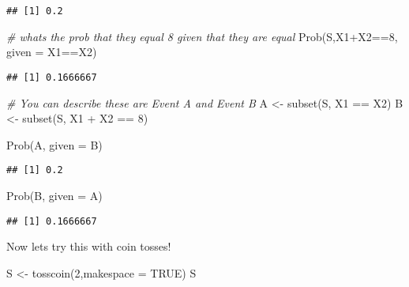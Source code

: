 \documentclass[
]{article}
\newenvironment{Shaded}{\begin{snugshade}}{\end{snugshade}}
\newcommand{\AttributeTok}[1]{\textcolor[rgb]{0.77,0.63,0.00}{#1}}
\newcommand{\CommentTok}[1]{\textcolor[rgb]{0.56,0.35,0.01}{\textit{#1}}}
\newcommand{\ConstantTok}[1]{\textcolor[rgb]{0.00,0.00,0.00}{#1}}
\newcommand{\DecValTok}[1]{\textcolor[rgb]{0.00,0.00,0.81}{#1}}
\newcommand{\FunctionTok}[1]{\textcolor[rgb]{0.00,0.00,0.00}{#1}}
\newcommand{\NormalTok}[1]{#1}
\newcommand{\OtherTok}[1]{\textcolor[rgb]{0.56,0.35,0.01}{#1}}
\newcommand{\SpecialCharTok}[1]{\textcolor[rgb]{0.00,0.00,0.00}{#1}}
\begin{document}
\begin{verbatim}
## [1] 0.2
\end{verbatim}

\begin{Shaded}
\begin{Highlighting}[]
\CommentTok{\# whats the prob that they equal 8 given that they are equal}
\FunctionTok{Prob}\NormalTok{(S,X1}\SpecialCharTok{+}\NormalTok{X2}\SpecialCharTok{==}\DecValTok{8}\NormalTok{, }\AttributeTok{given =}\NormalTok{ X1}\SpecialCharTok{==}\NormalTok{X2)}
\end{Highlighting}
\end{Shaded}

\begin{verbatim}
## [1] 0.1666667
\end{verbatim}

\begin{Shaded}
\begin{Highlighting}[]
\CommentTok{\# You can describe these are Event A and Event B}
\NormalTok{A }\OtherTok{\textless{}{-}} \FunctionTok{subset}\NormalTok{(S, X1 }\SpecialCharTok{==}\NormalTok{ X2)}
\NormalTok{B }\OtherTok{\textless{}{-}} \FunctionTok{subset}\NormalTok{(S, X1 }\SpecialCharTok{+}\NormalTok{ X2 }\SpecialCharTok{==} \DecValTok{8}\NormalTok{)}

\FunctionTok{Prob}\NormalTok{(A, }\AttributeTok{given =}\NormalTok{ B)}
\end{Highlighting}
\end{Shaded}

\begin{verbatim}
## [1] 0.2
\end{verbatim}

\begin{Shaded}
\begin{Highlighting}[]
\FunctionTok{Prob}\NormalTok{(B, }\AttributeTok{given =}\NormalTok{ A)}
\end{Highlighting}
\end{Shaded}

\begin{verbatim}
## [1] 0.1666667
\end{verbatim}

Now lets try this with coin tosses!

\begin{Shaded}
\begin{Highlighting}[]
\NormalTok{S }\OtherTok{\textless{}{-}} \FunctionTok{tosscoin}\NormalTok{(}\DecValTok{2}\NormalTok{,}\AttributeTok{makespace =} \ConstantTok{TRUE}\NormalTok{)}
\NormalTok{S}
\end{Highlighting}
\end{Shaded}
\end{document}
